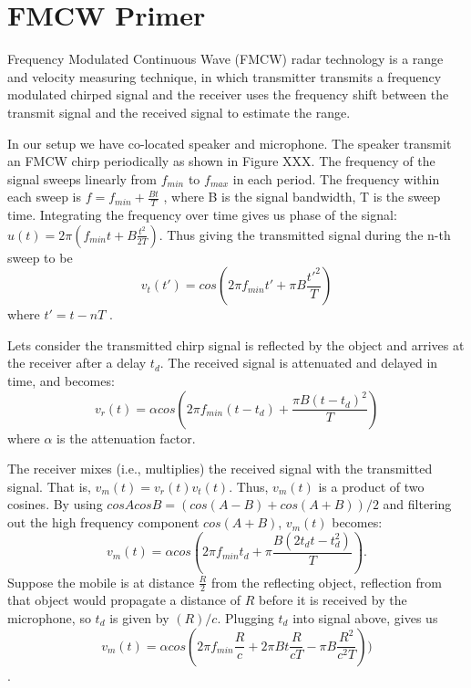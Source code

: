 \section{FMCW Primer}\label{sec:fmcw}
Frequency Modulated Continuous Wave (FMCW) radar technology is a range and velocity measuring technique, in which transmitter transmits a frequency modulated chirped signal and the receiver uses the frequency shift between the transmit signal and the received signal to estimate the range.  


\begin{figure}[h!t]
\end{figure}

In our setup we have co-located speaker and microphone. The speaker transmit an FMCW chirp periodically as shown in Figure XXX. The frequency of the signal sweeps linearly from $f_{min}$ to $f_{max}$ in each period. The frequency within each sweep is $f = f_{min} + \frac{Bt}{T}$ , where B is the signal bandwidth, T is the sweep time. Integrating the frequency over time gives us phase of the signal: $u(t)=2 \pi (f_{min}t + B \frac{t^2}{2T} )$.
Thus giving the transmitted signal during the n-th sweep to be
$$v_t(t') = cos(2 \pi f_{min}t'  + \pi B\frac{t'^2}{T})$$ where $t' = t - nT$ .

Lets consider the transmitted chirp signal is reflected by the object and arrives at the receiver after a delay $t_d$. The received signal is attenuated and delayed in time, and becomes:
$$v_r(t) = \alpha cos(2 \pi f_{min}(t - t_d) + \frac{\pi B(t - t_d)^2}{T} )$$
where $\alpha$ is the attenuation factor.

The receiver mixes (i.e., multiplies) the received signal with the transmitted signal. That is, $v_m(t) = v_r(t)v_t(t)$. Thus, $v_m(t)$ is a product of two cosines. By using $cos A cos B = (cos(A - B) +
cos(A + B))/2$ and filtering out the high frequency component $cos(A + B)$, $v_m(t)$ becomes:
$$ v_m(t) = \alpha cos(2 \pi f_{min} t_d +
\pi \frac{B(2 t_d t - t_d^2)}{T} ).$$
Suppose the mobile is at distance $\frac{R}{2}$ from the reflecting object, reflection from that object would propagate a distance of $R$ before it is received by the microphone, so $t_d$ is given by $(R)/c$. Plugging $t_d$ into signal above, gives us
$$v_m(t) = \alpha cos(2 \pi f_{min} \frac{R}{c} + 2 \pi Bt\frac{R}{cT} - \pi B\frac{R^2}{c^2 T} ))$$.

